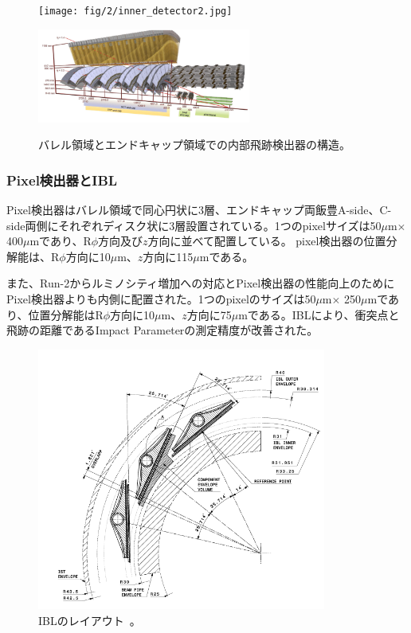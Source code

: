 \begin{figure}[h]
  \begin{minipage}[b]{0.45\linewidth}
      \centering
      \texttt{[image: fig/2/inner\_detector2.jpg]}
      \label{fig:2-8-1}
  \end{minipage}
    \begin{minipage}[b]{0.45\linewidth}
      \centering
      \includegraphics[clip, width=7cm]{fig/2/inner_detector3.png}
      \label{fig:2-8-2}
  \end{minipage}
  \caption{バレル領域とエンドキャップ領域での内部飛跡検出器の構造\cite{Aad:1129811}。}
\end{figure}

\subsubsection{Pixel検出器とIBL}
Pixel検出器はバレル領域で同心円状に3層、エンドキャップ両飯豊A-side、C-side両側にそれぞれディスク状に3層設置されている。1つのpixelサイズは50$\mu$m$\times$ 400$\mu$mであり、R$\phi$方向及び$z$方向に並べて配置している。
pixel検出器の位置分解能は、R$\phi$方向に10$\mu$m、$z$方向に115$\mu$mである。

また、Run-2からルミノシティ増加への対応とPixel検出器の性能向上のためにPixel検出器よりも内側に配置された。1つのpixelのサイズは50$\mu$m$\times$ 250$\mu$mであり、位置分解能はR$\phi$方向に10$\mu$m、$z$方向に75$\mu$mである。IBLにより、衝突点と飛跡の距離であるImpact Parameterの測定精度が改善された。

\begin{figure}[h]
  \centering
  \includegraphics[clip, width=9.5cm]{fig/2/IBL_layout.png}
  \caption{IBLのレイアウト~\cite{article:ATLASBlayerTDR}。}
  \label{fig:2-9}
\end{figure}

